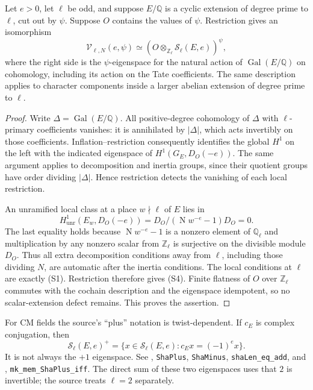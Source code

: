 \begin{proposition}
Let $e>0$, let $\ell$ be odd, and suppose $E/\mathbb Q$ is a cyclic
extension of degree prime to $\ell$, cut out by $\psi$. Suppose $O$ contains
the values of $\psi$. Restriction gives an isomorphism
\[
 \mathcal V_{\ell,N}(e,\psi)
 \simeq
 \left(O\otimes_{\mathbb Z_\ell}\mathcal S_\ell(E,e)\right)^{\psi},
 \tag{S4}
\]
where the right side is the $\psi$-eigenspace for the natural action of
$\operatorname{Gal}(E/\mathbb Q)$ on cohomology, including its action on
the Tate coefficients. The same description applies to character components
inside a larger abelian extension of degree prime to $\ell$.
\end{proposition}
\begin{proof}
Write $\Delta=\operatorname{Gal}(E/\mathbb Q)$. All positive-degree
cohomology of $\Delta$ with $\ell$-primary coefficients vanishes: it is
annihilated by $|\Delta|$, which acts invertibly on those coefficients.
Inflation--restriction consequently identifies the global $H^1$ on the
left with the indicated eigenspace of $H^1(G_E,D_O(-e))$. The same argument
applies to decomposition and inertia groups, since their quotient groups
have order dividing $|\Delta|$. Hence restriction detects the vanishing of
each local restriction.

An unramified local class at a place $w\nmid\ell$ of $E$ lies in
\[
 H^1_{\mathrm{unr}}(E_w,D_O(-e))
 =D_O/(\operatorname{N}w^{-e}-1)D_O=0.
\]
The last equality holds because $\operatorname{N}w^{-e}-1$ is a nonzero
element of $\mathbb Q_\ell$ and multiplication by any nonzero scalar from
$\mathbb Z_\ell$ is surjective on the divisible module $D_O$.
Thus all extra decomposition conditions away from $\ell$, including
those dividing $N$, are automatic after the inertia conditions. The local
conditions at $\ell$ are exactly (S1). Restriction therefore gives (S4).
Finite flatness of $O$ over $\mathbb Z_\ell$ commutes with the cochain
description and the eigenspace idempotent, so no scalar-extension defect
remains. This proves the assertion.
\end{proof}

For CM fields the source's ``plus'' notation is twist-dependent. If $c_E$
is complex conjugation, then
\[
 \mathcal S_\ell(E,e)^+
 =\{x\in\mathcal S_\ell(E,e):c_E x=(-1)^e x\}.
 \tag{S5}
\]
It is not always the $+1$ eigenspace. See
, \texttt{ShaPlus}, \texttt{ShaMinus},
\texttt{shaLen\_eq\_add}, and
, \texttt{mk\_mem\_ShaPlus\_iff}.
The direct sum of these two eigenspaces uses that $2$ is invertible;
the source treats $\ell=2$ separately.

